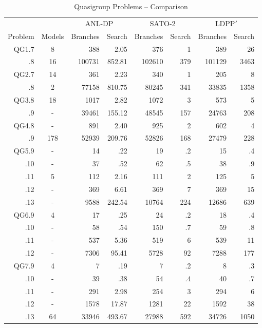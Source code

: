 \begin{table}[htb] \centering
\caption{Quasigroup Problems -- Comparison} \label{qg-tab-compare}
\begin{tabular}{rc|rr|rr|rr}
 & & \multicolumn{2}{c}{ANL-DP} & \multicolumn{2}{c}{SATO-2}& \multicolumn{2}{c}{LDPP$'$} \\
    Problem & Models & Branches & Search & Branches & Search & Branches & Search \\
 \hline
    QG1.7 &   8 &    388 &   2.05 & 376    & 1 & 389 & 26\\
       .8 &  16 & 100731 & 852.81 & 102610 & 379 & 101129 & 3463\\
 \hline
    QG2.7 &  14 &    361 &   2.23 & 340    & 1 & 205 & 8\\
       .8 &   2 &  77158 & 810.75 & 80245  & 341 & 33835 & 1358\\
 \hline
    QG3.8 &  18 &   1017 &   2.82 & 1072   & 3 & 573 & 5\\
       .9 &   - &  39461 & 155.12 & 48545  & 157 & 24763 & 208\\
 \hline
    QG4.8 &   - &    891 &   2.40 & 925    & 2 & 602 & 4\\
       .9 & 178 &  52939 & 209.76 & 52826  & 168 & 27479 & 228\\
 \hline
   QG5.9  &   - &     14 &    .22 & 19     & .2 & 15 & .4\\
      .10 &   - &     37 &    .52 & 62     & .5 & 38 & .9\\
      .11 &   5 &    112 &   2.16 & 111    & 2 & 125 & 5\\
      .12 &   - &    369 &   6.61 & 369    & 7 & 369 & 15\\
      .13 &   - &   9588 & 242.54 & 10764  & 224 & 12686 & 639\\
 \hline
   QG6.9  &   4 &     17 &    .25 & 24     & .2 & 18 & .4\\
      .10 &   - &     58 &    .54 & 150    & .7 & 59 & .8\\
      .11 &   - &    537 &   5.36 & 519    & 6 & 539 & 11\\
      .12 &   - &   7306 &  95.41 & 5728   & 92 & 7288 & 177\\
 \hline
   QG7.9  &   4 &      7 &    .19 & 7      & .2 & 8 & .3\\
      .10 &   - &     39 &    .38 & 54     & .4 & 40 & .7\\
      .11 &   - &    291 &   2.98 & 254    & 3 & 294 & 6\\
      .12 &   - &   1578 &  17.87 & 1281   & 22 & 1592 & 38\\
      .13 &  64 &  33946 & 493.67 & 27988  & 592 & 34726 & 1050\\
\hline
\end{tabular}
\end{table}
\newpage

